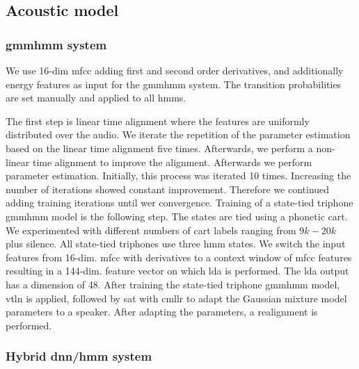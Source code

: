 \documentclass[a4paper]{article}
\begin{document}
\subsection{Acoustic model}
\label{sec:am}

\subsubsection{\Ac{gmmhmm} system}

We use 16-dim \ac{mfcc} adding first and second order derivatives, and additionally energy features as input for the \ac{gmmhmm} system.
The transition probabilities are set manually and applied to all \acp{hmm}.

The first step is linear time alignment where the features are uniformly distributed over the audio.
We iterate the repetition of the parameter estimation based on the linear time alignment five times.
Afterwards, we perform a non-linear time alignment to improve the alignment.
Afterwards we perform parameter estimation.
Initially, this process was iterated 10 times.
Increasing the number of iterations showed constant improvement.
Therefore we continued adding training iterations until \ac{wer} convergence.
Training of a state-tied triphone \ac{gmmhmm} model is the following step.
The states are tied using a phonetic \ac{cart}.
We experimented with different numbers of \ac{cart} labels ranging from $9k-20k$ plus silence.
All state-tied triphones use three \ac{hmm} states.
We switch the input features from 16-dim. \ac{mfcc} with derivatives to a context window of \ac{mfcc} features resulting in a 144-dim. feature vector on which \ac{lda} is performed.
The \ac{lda} output has a dimension of 48.
After training the state-tied triphone \ac{gmmhmm} model, \ac{vtln} is applied, followed by \ac{sat} with \acl*{cmllr} to adapt the Gaussian mixture model parameters to a speaker.
After adapting the parameters, a realignment is performed.

\subsubsection{Hybrid \ac{dnn}/\ac{hmm} system}
\end{document}
